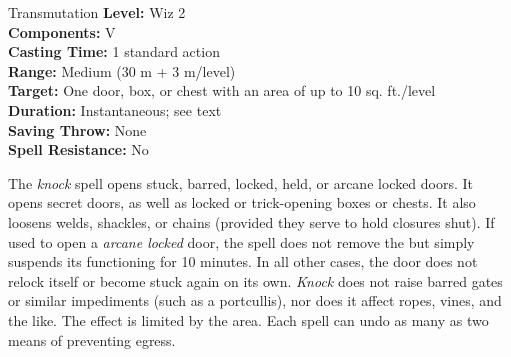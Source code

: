 {Transmutation}
{
	\textbf{Level:}
	Wiz 2\\
	\textbf{Components:}
	V\\
	\textbf{Casting Time:}
	1 standard action\\
	\textbf{Range:}
	Medium (30 m + 3 m/level)\\
	\textbf{Target:}
	One door, box, or chest with an area of up to 10 sq. ft./level\\
	\textbf{Duration:}
	Instantaneous; see text\\
	\textbf{Saving Throw:}
	None\\
	\textbf{Spell Resistance:}
	No\\
}
{
	The \emph{knock} spell opens stuck, barred, locked, held, or arcane locked doors. It opens secret doors, as well as locked or trick-opening boxes or chests. It also loosens welds, shackles, or chains (provided they serve to hold closures shut). If used to open a \emph{arcane locked} door, the spell does not remove the  but simply suspends its functioning for 10 minutes. In all other cases, the door does not relock itself or become stuck again on its own. \emph{Knock} does not raise barred gates or similar impediments (such as a portcullis), nor does it affect ropes, vines, and the like. The effect is limited by the area. Each spell can undo as many as two means of preventing egress.

}
